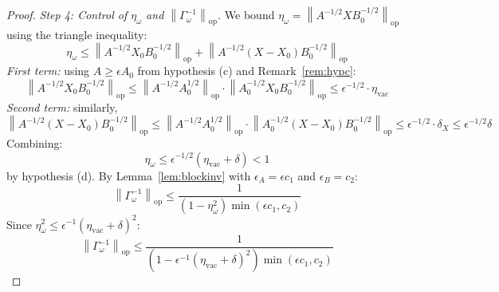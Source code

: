 \documentclass[11pt,a4paper]{article}
\theoremstyle{plain}
\theoremstyle{definition}
\theoremstyle{remark}
\newcommand{\opnorm}[1]{\left\lVert #1 \right\rVert_{\mathrm{op}}}
\newcommand{\etavac}{\eta_{\mathrm{vac}}}
\begin{document}
\begin{proof}
\emph{Step 4: Control of $\eta_\omega$ and $\opnorm{\Gamma_\omega^{-1}}$.} We bound
$\eta_\omega = \opnorm{A^{-1/2} X B_0^{-1/2}}$ using the triangle inequality:
\begin{equation}
\eta_\omega \le \opnorm{A^{-1/2} X_0 B_0^{-1/2}}
+ \opnorm{A^{-1/2}(X - X_0)B_0^{-1/2}}
\end{equation}
\emph{First term:} using $A \ge \epsilon A_0$ from hypothesis (c) and
Remark~\ref{rem:hypc}:
\begin{equation}
\opnorm{A^{-1/2} X_0 B_0^{-1/2}}
\le \opnorm{A^{-1/2} A_0^{1/2}} \cdot \opnorm{A_0^{-1/2} X_0 B_0^{-1/2}}
\le \epsilon^{-1/2} \cdot \etavac
\end{equation}
\emph{Second term:} similarly,
\begin{equation}
\opnorm{A^{-1/2}(X - X_0)B_0^{-1/2}}
\le \opnorm{A^{-1/2} A_0^{1/2}} \cdot \opnorm{A_0^{-1/2}(X - X_0)B_0^{-1/2}}
\le \epsilon^{-1/2} \cdot \delta_X \le \epsilon^{-1/2} \delta
\end{equation}
Combining:
\begin{equation}
\eta_\omega \le \epsilon^{-1/2}(\etavac + \delta) < 1
\end{equation}
by hypothesis (d). By Lemma~\ref{lem:blockinv} with $\epsilon_A = \epsilon c_1$ and
$\epsilon_B = c_2$:
\begin{equation}
\opnorm{\Gamma_\omega^{-1}} \le
\frac{1}{(1 - \eta_\omega^2)\min(\epsilon c_1, c_2)}
\end{equation}
Since $\eta_\omega^2 \le \epsilon^{-1}(\etavac + \delta)^2$:
\begin{equation}\label{eq:gammainv}
\opnorm{\Gamma_\omega^{-1}} \le
\frac{1}{\left(1 - \epsilon^{-1}(\etavac + \delta)^2\right)\min(\epsilon c_1, c_2)}
\end{equation}


\end{proof}
\end{document}
